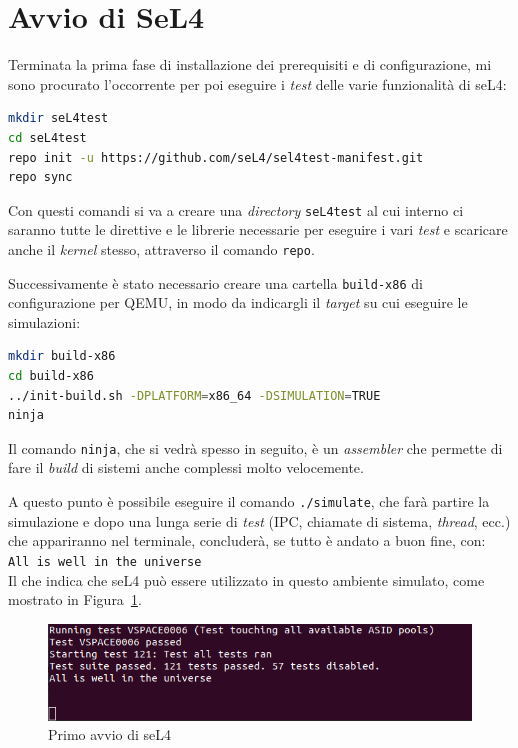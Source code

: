 \section{Avvio di SeL4}
Terminata la prima fase di installazione dei prerequisiti e di configurazione, mi sono procurato l'occorrente per poi eseguire i \textit{test} delle varie funzionalità di seL4:
\begin{lstlisting}[language=bash]
mkdir seL4test
cd seL4test
repo init -u https://github.com/seL4/sel4test-manifest.git
repo sync
\end{lstlisting}

Con questi comandi si va a creare una \textit{directory} \texttt{seL4test} al cui interno ci saranno tutte le direttive e le librerie necessarie per eseguire i vari \textit{test} e scaricare anche il \textit{kernel} stesso, attraverso il comando \texttt{repo}.

Successivamente è stato necessario creare una cartella \texttt{build-x86} di configurazione per QEMU, in modo da indicargli il \textit{target} su cui eseguire le simulazioni:
\begin{lstlisting}[language=bash]
mkdir build-x86
cd build-x86
../init-build.sh -DPLATFORM=x86_64 -DSIMULATION=TRUE
ninja
\end{lstlisting}

Il comando \texttt{ninja}, che si vedrà spesso in seguito, è un \textit{assembler} che permette di fare il \textit{build} di sistemi anche complessi molto velocemente.

A questo punto è possibile eseguire il comando \texttt{./simulate}, che farà partire la simulazione e dopo una lunga serie di \textit{test} (IPC, chiamate di sistema, \textit{thread}, ecc.) che appariranno nel terminale, concluderà, se tutto è andato a buon fine, con:\\
\texttt{All is well in the universe}\\
Il che indica che seL4 può essere utilizzato in questo ambiente simulato, come mostrato in Figura~\ref{fig:PrimaSimulazione}.
\begin{figure}[H]
  \includegraphics[width=\linewidth]{img/PrimaSimulazione.png}
  \caption{Primo avvio di seL4}
  \label{fig:PrimaSimulazione}
\end{figure}

